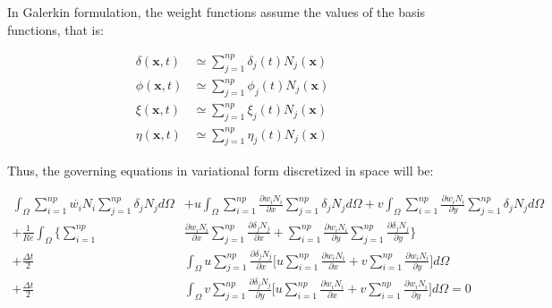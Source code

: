 \medskip
In Galerkin formulation, the weight functions assume 
the values of the basis functions, that is:

\begin{align}
 \delta(\textbf{x},t) & \simeq \sum\limits_{j=1}^{np} \delta_j(t) N_j(\textbf{x}) \\
 \phi(\textbf{x},t) & \simeq \sum\limits_{j=1}^{np} \phi_j(t) N_j(\textbf{x}) \\
 \xi(\textbf{x},t) & \simeq \sum\limits_{j=1}^{np} \xi_j(t) N_j(\textbf{x}) \\
 \eta(\textbf{x},t) & \simeq \sum\limits_{j=1}^{np} \eta_j(t) N_j(\textbf{x})
\end{align}

\noindent
Thus, the governing equations in variational form 
discretized in space will be:

\begin{equation} \label{convection vorticity}
 \begin{aligned} 
  \int_{\Omega} \sum\limits_{i=1}^{np} \overset{.}{w_i} N_i 
                \sum\limits_{j=1}^{np} \delta_j N_j d\Omega 
  & + u \int_{\Omega} \sum\limits_{i=1}^{np} \frac{\partial w_i N_i}{\partial x} 
                    \sum\limits_{j=1}^{np} \delta_j N_j d\Omega 
  + v \int_{\Omega} \sum\limits_{i=1}^{np} \frac{\partial w_i N_i}{\partial y} 
                    \sum\limits_{j=1}^{np} \delta_j N_j d\Omega 
  \\[5pt]
  + \frac{1}{\textit{Re}} \int_{\Omega} \Bigg\{ 
                    \sum\limits_{i=1}^{np} & \frac{\partial w_i N_i}{\partial x} 
                    \sum\limits_{j=1}^{np} \frac{\partial \delta_j N_j}{\partial x} 
  +                 \sum\limits_{i=1}^{np} \frac{\partial w_i N_i}{\partial y} 
                    \sum\limits_{j=1}^{np} \frac{\partial \delta_j N_j}{\partial y} \Bigg\}
 \\[5pt]
 + \frac{\Delta t}{2} & \int_{\Omega} u \sum\limits_{j=1}^{np} \frac{\partial \delta_j N_j}{\partial x}
 \Bigg[
   u \sum\limits_{i=1}^{np} \frac{\partial w_i N_i}{\partial x}
 + v \sum\limits_{i=1}^{np} \frac{\partial w_i N_i}{\partial y}
 \Bigg] d\Omega
 \\[5pt] 
 + \frac{\Delta t}{2} & \int_{\Omega} v \sum\limits_{j=1}^{np} \frac{\partial \delta_j N_j}{\partial y}
 \Bigg[
   u \sum\limits_{i=1}^{np} \frac{\partial w_i N_i}{\partial x}
 + v \sum\limits_{i=1}^{np} \frac{\partial w_i N_i}{\partial y}
 \Bigg] d\Omega = 0
 \end{aligned}
\end{equation}

